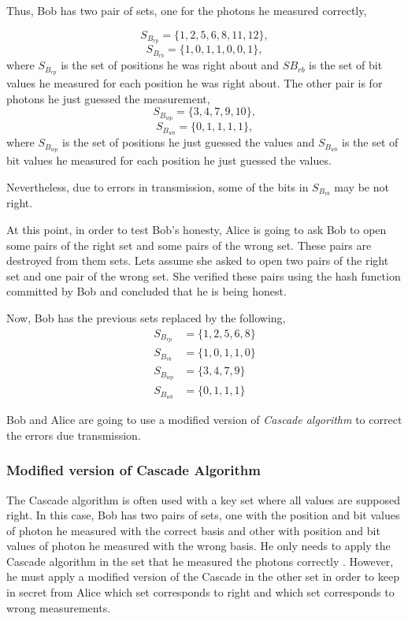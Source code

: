 \begin{enumerate}
      Thus, Bob has two pair of sets, one for the photons he measured correctly,

      $$S_{B_{rp}}= \{1,2,5,6,8,11,12 \},$$ $$ S_{B_{rb}} = \{1,0,1,1,0,0,1 \},$$
      where $S_{B_{rp}}$ is the set of positions he was right about and $SB_{rb}$ is the set of bit values he measured for each position he was right about. The other pair is for photons he just guessed the measurement,
      $$S_{B_{wp}}= \{3,4,7,9,10 \},$$ $$S_{B_{wb}} = \{0,1,1,1,1 \},$$
      where $S_{B_{wp}}$ is the set of positions he just guessed the values and $S_{B_{wb}}$ is the set of bit values he measured for each position he just guessed the values.

      Nevertheless, due to errors in transmission, some of the bits in $S_{B_{rb}}$ may be not right.

      At this point, in order to test Bob's honesty, Alice is going to ask Bob to open some pairs of the right set and some pairs of the wrong set. These pairs are destroyed from them sets. Lets assume she asked to open two pairs of the right set and one pair of the wrong set. She verified these pairs using the hash function committed by Bob and concluded that he is being honest.

      Now, Bob has the previous sets replaced by the following,
      \begin{align*}
        S_{B_{rp}} & = \{1,2,5,6,8 \} \\
        S_{B_{rb}} & = \{1,0,1,1,0 \} \\
        S_{B_{wp}} & = \{3,4,7,9 \} \\
        S_{B_{wb}} & = \{0,1,1,1 \}
      \end{align*}


      Bob and Alice are going to use a modified version of \textit{Cascade algorithm} to correct the errors due transmission.

      \subsubsection{Modified version of Cascade Algorithm}
      The Cascade algorithm is often used with a key set where all values are supposed right. In this case, Bob has two pairs of sets, one with the position and bit values of photon he measured with the correct basis and other with position and bit values of photon he measured with the wrong basis. He only needs to apply the Cascade algorithm in the set that he measured the photons correctly \cite{Brassard1994}. However, he must apply a modified version of the Cascade in the other set in order to keep in secret from Alice which set corresponds to right and which set corresponds to wrong measurements.


\end{enumerate}
